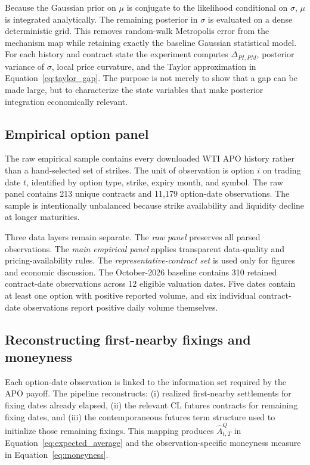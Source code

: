 Because the Gaussian prior on $\mu$ is conjugate to the likelihood conditional on $\sigma$, $\mu$ is integrated analytically. The remaining posterior in $\sigma$ is evaluated on a dense deterministic grid. This removes random-walk Metropolis error from the mechanism map while retaining exactly the baseline Gaussian statistical model. For each history and contract state the experiment computes $\Delta_{PI,PM}$, posterior variance of $\sigma$, local price curvature, and the Taylor approximation in Equation~\eqref{eq:taylor_gap}. The purpose is not merely to show that a gap can be made large, but to characterize the state variables that make posterior integration economically relevant.

\subsection{Empirical option panel}

The raw empirical sample contains every downloaded WTI APO history rather than a hand-selected set of strikes. The unit of observation is option $i$ on trading date $t$, identified by option type, strike, expiry month, and symbol. The raw panel contains 213 unique contracts and 11,179 option-date observations. The sample is intentionally unbalanced because strike availability and liquidity decline at longer maturities.

Three data layers remain separate. The \emph{raw panel} preserves all parsed observations. The \emph{main empirical panel} applies transparent data-quality and pricing-availability rules. The \emph{representative-contract set} is used only for figures and economic discussion. The October-2026 baseline contains 310 retained contract-date observations across 12 eligible valuation dates. Five dates contain at least one option with positive reported volume, and six individual contract-date observations report positive daily volume themselves.

\subsection{Reconstructing first-nearby fixings and moneyness}

Each option-date observation is linked to the information set required by the APO payoff. The pipeline reconstructs: (i) realized first-nearby settlements for fixing dates already elapsed, (ii) the relevant CL futures contracts for remaining fixing dates, and (iii) the contemporaneous futures term structure used to initialize those remaining fixings. This mapping produces $\widehat A^Q_{t,T}$ in Equation~\eqref{eq:expected_average} and the observation-specific moneyness measure in Equation~\eqref{eq:moneyness}.

